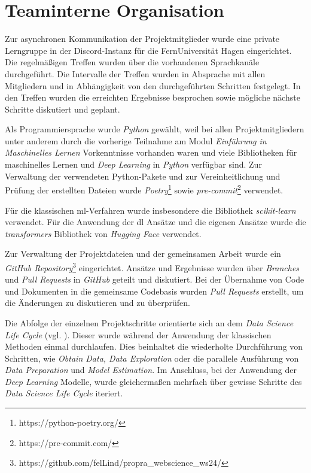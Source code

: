 \section{Teaminterne Organisation}

Zur asynchronen Kommunikation der Projektmitglieder wurde eine private Lerngruppe in der Discord-Instanz für die FernUniversität Hagen eingerichtet.
Die regelmäßigen Treffen wurden über die vorhandenen Sprachkanäle durchgeführt.
Die Intervalle der Treffen wurden in Absprache mit allen Mitgliedern und in Abhängigkeit von den durchgeführten Schritten festgelegt.
In den Treffen wurden die erreichten Ergebnisse besprochen sowie mögliche nächste Schritte diskutiert und geplant.

Als Programmiersprache wurde \textit{Python} gewählt, weil bei allen Projektmitgliedern unter anderem durch die vorherige Teilnahme am Modul \textit{Einführung in Maschinelles Lernen} Vorkenntnisse vorhanden waren und viele Bibliotheken für maschinelles Lernen und \textit{Deep Learning} in \textit{Python} verfügbar sind.
Zur Verwaltung der verwendeten Python-Pakete und zur Vereinheitlichung und Prüfung der erstellten Dateien wurde \textit{Poetry}\footnote{https://python-poetry.org/} sowie \textit{pre-commit}\footnote{https://pre-commit.com/} verwendet.

Für die klassischen \gls{ml}-Verfahren wurde insbesondere die Bibliothek \textit{scikit-learn} verwendet.
Für die Anwendung der \gls{dl} Ansätze und die eigenen Ansätze wurde die \textit{transformers} Bibliothek von \textit{Hugging Face} verwendet.

Zur Verwaltung der Projektdateien und der gemeinsamen Arbeit wurde ein \textit{GitHub Repository}\footnote{https://github.com/felLind/propra\_webscience\_ws24/} eingerichtet.
Ansätze und Ergebnisse wurden über \textit{Branches} und \textit{Pull Requests} in \textit{GitHub} geteilt und diskutiert.
Bei der Übernahme von Code und Dokumenten in die gemeinsame Codebasis wurden \textit{Pull Requests} erstellt, um die Änderungen zu diskutieren und zu überprüfen.

Die Abfolge der einzelnen Projektschritte orientierte sich an dem \textit{Data Science Life Cycle} (vgl. \cite[Abb. 2]{Stodden2020}).
Dieser wurde während der Anwendung der klassischen Methoden einmal durchlaufen.
Dies beinhaltet die wiederholte Durchführung von Schritten, wie \textit{Obtain Data, Data Exploration} oder die parallele Ausführung von \textit{Data Preparation} und \textit{Model Estimation}.
Im Anschluss, bei der Anwendung der \textit{Deep Learning} Modelle, wurde gleichermaßen mehrfach über gewisse Schritte des \textit{Data Science Life Cycle} iteriert.

